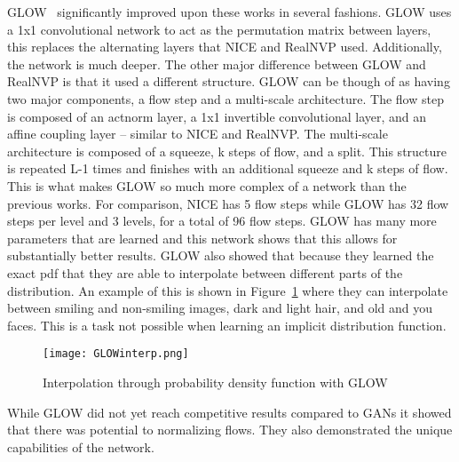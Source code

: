 GLOW~\cite{glow} significantly improved upon these works in several fashions.
GLOW uses a 1x1 convolutional network to act as the permutation matrix between
layers, this replaces the alternating layers that NICE and RealNVP used. 
Additionally, the network is much deeper. The other major difference between
GLOW and RealNVP is that it used a different structure. GLOW can be though of as
having two major components, a flow step and a multi-scale architecture. The
flow step is composed of an actnorm layer, a 1x1 invertible convolutional layer,
and an affine coupling layer -- similar to NICE and RealNVP. The multi-scale
architecture is composed of a squeeze, k steps of flow, and a split. This
structure is repeated L-1 times and finishes with an additional squeeze and k
steps of flow. This is what makes GLOW so much more complex of a network than
the previous works. For comparison, NICE has 5
flow steps while GLOW has 32 flow steps per level and 3 levels, for a total of
96 flow steps. GLOW has many more parameters that are learned and this network
shows that this allows for substantially better results. GLOW also showed that
because they learned the exact pdf that they are able to interpolate between
different parts of the distribution. An example of this is shown in
Figure~\ref{fig:glowinterp} where they can interpolate between smiling and
non-smiling images, dark and light hair, and old and you faces. This is a task
not possible when learning an implicit distribution function.
%
\begin{figure}
\center\texttt{[image: GLOWinterp.png]}
\caption{Interpolation through probability density function with GLOW}
\label{fig:glowinterp}
\end{figure}
%
While GLOW did not yet
reach competitive results compared to GANs it showed that there was potential to
normalizing flows. They also demonstrated the unique capabilities of the
network.


